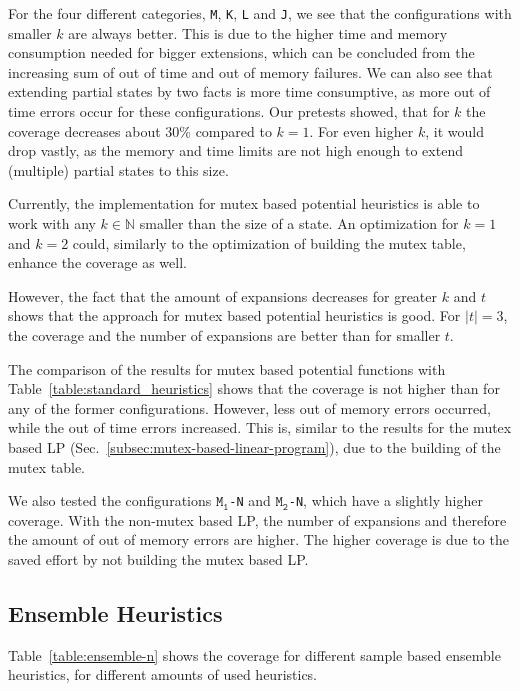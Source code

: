 For the four different categories, \texttt{M}, \texttt{K}, \texttt{L} and \texttt{J}, we see that the configurations with smaller $k$ are always  better.
This is due to the higher time and memory consumption needed for bigger extensions, which can be concluded from the increasing sum of out of time and out of memory failures.
We can also see that extending partial states by two facts is more time consumptive, as more out of time errors occur for these configurations.
Our pretests showed, that for $k$ the coverage decreases about 30\% compared to $k=1$.
For even higher $k$, it would drop vastly, as the memory and time limits are not high enough to extend (multiple) partial states to this size.

Currently, the implementation for mutex based potential heuristics is able to work with any $k\in \mathbb{N}$ smaller than the size of a state.
An optimization for $k=1$ and $k=2$ could, similarly to the optimization of building the mutex table, enhance the coverage as well.

However, the fact that the amount of expansions decreases for greater $k$ and $t$ shows that the approach for mutex based potential heuristics is good.
For $|t|=3$, the coverage and the number of expansions are better than for smaller $t$.

The comparison of the results for mutex based potential functions with Table~\ref{table:standard_heuristics} shows that the coverage is not higher than for any of the former configurations.
However, less out of memory errors occurred, while the out of time errors increased.
This is, similar to the results for the mutex based LP (Sec.~\ref{subsec:mutex-based-linear-program}), due to the building of the mutex table.

We also tested the configurations $\texttt{M}_\texttt{1}$\texttt{-N} and $\texttt{M}_\texttt{2}$\texttt{-N}, which have a slightly higher coverage.
With the non-mutex based LP, the number of expansions and therefore the amount of out of memory errors are higher.
The higher coverage is due to the saved effort by not building the mutex based LP.


\subsection{Ensemble Heuristics}\label{subsec:mutex-based-ensemble-heuristics}
Table~\ref{table:ensemble-n} shows the coverage for different sample based ensemble heuristics, for different amounts of used heuristics.

